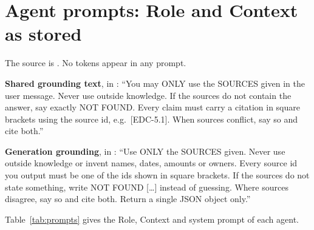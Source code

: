 \chapter{Agent prompts: Role and Context as stored}
\label{app:prompts}

The source is . No tokens appear in any prompt.

\textbf{Shared grounding text}, in : ``You may ONLY use the SOURCES given in the user message. Never use outside knowledge. If the sources do not contain the answer, say exactly NOT FOUND. Every claim must carry a citation in square brackets using the source id, e.g.\ [EDC-5.1]. When sources conflict, say so and cite both.''

\textbf{Generation grounding}, in : ``Use ONLY the SOURCES given. Never use outside knowledge or invent names, dates, amounts or owners. Every source id you output must be one of the ids shown in square brackets. If the sources do not state something, write NOT FOUND [\ldots] instead of guessing. Where sources disagree, say so and cite both. Return a single JSON object only.''

Table~\ref{tab:prompts} gives the Role, Context and system prompt of each agent.

